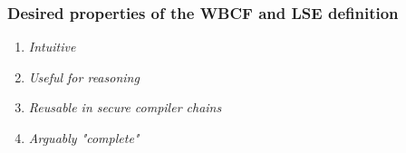 \documentclass[aspectratio=169]{beamer}
\begin{document}
\begin{frame}
  \frametitle{Desired properties of the WBCF and LSE definition}
  \begin{enumerate}
\item {\itshape Intuitive}%
\item {\itshape Useful for reasoning}%
\item {\itshape Reusable in secure compiler chains}%
\item {\itshape Arguably "complete"}%
\end{enumerate}
\end{frame}
\end{document}
